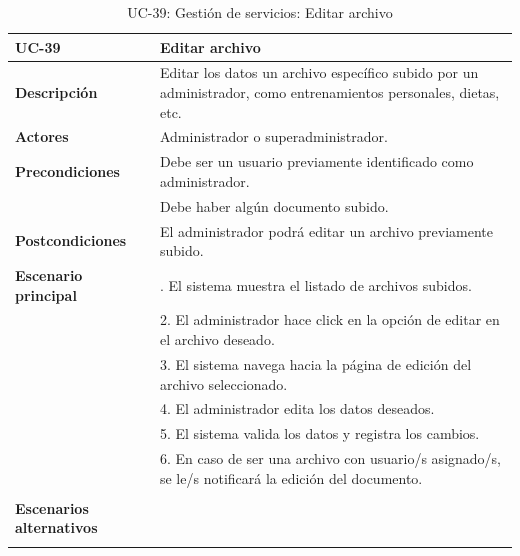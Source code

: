 \begin{table}
  \begin{center}
    \begin{tabularx}{16.4cm}{|l|X|}
      \hline
      \textbf{UC-39} & \textbf{Editar archivo}\\
      \hline
      \textbf{Descripción} & Editar los datos un archivo específico subido por un administrador, como entrenamientos personales, dietas, etc. \\
      \hline
      \textbf{Actores} & Administrador o superadministrador.\\
      \hline
      \textbf{Precondiciones} & Debe ser un usuario previamente identificado como administrador.\\
      & Debe haber algún documento subido.\\
      \hline
      \textbf{Postcondiciones} & El administrador podrá editar un archivo previamente subido.\\
      \hline
      \textbf{Escenario principal} & \smallskip 1. El sistema muestra el listado de archivos subidos.\\
      & 2. El administrador hace click en la opción de editar en el archivo deseado.\\
      & 3. El sistema navega hacia la página de edición del archivo seleccionado.\\
      & 4. El administrador edita los datos deseados.\\
      & 5. El sistema valida los datos y registra los cambios.\\
      & 6. En caso de ser una archivo con usuario/s asignado/s, se le/s notificará la edición del documento.\\
      & \\
      \hline
      \textbf{Escenarios alternativos} & \\
      & \\
      \hline
    \end{tabularx}
    \caption{UC-39: Gestión de servicios: Editar archivo}
    \label{tab:CU-editar-archivo}
  \end{center}
\end{table}


